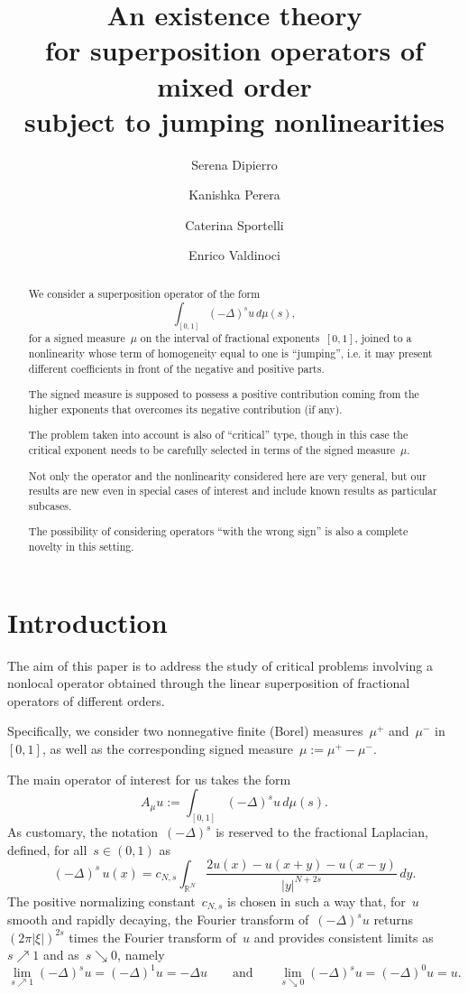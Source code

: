 \documentclass[12pt,a4paper,intlimits,sumlimits]{amsart}
\title[Superposition operators of mixed order and jumping nonlinearities]{An existence theory \\
for superposition operators of mixed order\\
subject to jumping nonlinearities}
\author{Serena Dipierro}
\author{Kanishka Perera}
\author{Caterina Sportelli}
\author{Enrico Valdinoci}
\date{}
\def \R {\mathbb{R}}
\theoremstyle{definition}
\theoremstyle{plain}
\numberwithin{equation}{section}
\begin{document}
 \maketitle

\begin{abstract}
We consider a superposition operator of the form
$$ \int_{[0, 1]} (-\Delta)^s u\, d\mu(s),$$
for a signed measure~$\mu$ on the interval of fractional exponents~$[0,1]$,
joined to a nonlinearity whose term of homogeneity equal to one is ``jumping'', i.e.
it may present different coefficients in front of the negative and positive parts.

The signed measure is supposed to possess a positive contribution coming from the higher exponents that overcomes its negative contribution (if any).

The problem taken into account is also of ``critical'' type, though in this case the critical exponent
needs to be carefully selected in terms of the signed measure~$\mu$.

Not only the operator and the nonlinearity considered here are very general,
but our results are new even in special cases of interest and include known results as particular subcases.

The possibility of considering operators ``with the wrong sign'' is also a complete novelty in this setting.
\end{abstract}
 
\section{Introduction} 

The aim of this paper is to address the study of critical problems involving a nonlocal operator
obtained through the linear superposition of fractional operators of different orders.

Specifically,
we consider two nonnegative finite (Borel) measures~$\mu^+$ and~$\mu^-$ in~$[{{ 0 }}, 1]$,
as well as the corresponding signed measure~$\mu:=\mu^+ -\mu^-$.

The main operator of interest for us takes the form
\begin{equation}\label{AMMU} A_\mu u:=\int_{[{{ 0 }}, 1]} (-\Delta)^s u\, d\mu(s) .\end{equation}
As customary, the notation~$(-\Delta)^s$ is reserved to the fractional Laplacian, defined, for all~$s\in(0,1)$ as
\begin{equation}\label{AMMU0} (- \Delta)^s\, u(x) = c_{N,s}\int_{\R^N} \frac{2u(x) - u(x+y)-u(x-y)}{|y|^{N+2s}}\, dy.
\end{equation}
The positive normalizing constant~$c_{N,s}$ is chosen in such a way that, for~$u$ smooth and rapidly decaying,
the Fourier transform of~$(-\Delta)^s u$ returns~$(2\pi|\xi|)^{2s}$ times the Fourier transform of~$u$
and provides
consistent limits as~$s\nearrow1$ and as~$s\searrow0$, namely
$$ \lim_{s\nearrow1}(-\Delta)^su=(-\Delta)^1u=-\Delta u
\qquad{\mbox{and}}\qquad
\lim_{s\searrow0}(-\Delta)^s u=(-\Delta)^0u=u.
$$
\end{document}
